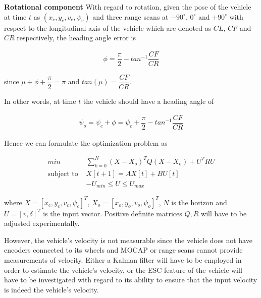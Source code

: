 \documentclass[oneside,12pt]{article}
\begin{document}
\begin{itemize}
    \begin{figure}[H]\centering
      \scalebox{1}{}
      \caption{}
      \label{}
    \end{figure}

    \textbf{Rotational component} With regard to rotation, given the pose of
    the vehicle at time $t$ as $(x_c, y_c, v_c, \psi_v)$ and three range scans
    at $-90^\circ$, $0^\circ$ and $+90^\circ$ with respect to the longitudinal
    axis of the vehicle which are denoted as $CL$, $CF$ and $CR$ respectively,
    the heading angle error is

    \begin{align}
      \phi = \dfrac{\pi}{2} - tan^{-1}\dfrac{CF}{CR}
    \end{align}

    since $\mu + \phi + \dfrac{\pi}{2} = \pi$ and $tan(\mu) = \dfrac{CF}{CR}$.

    In other words, at time $t$ the vehicle should have a heading angle of

    \begin{align}
      \psi_o = \psi_c + \phi = \psi_c + \dfrac{\pi}{2} - tan^{-1}\dfrac{CF}{CR}
    \end{align}


    \begin{figure}[H]\centering
      \scalebox{1}{}
      \caption{}
      \label{}
    \end{figure}

    Hence we can formulate the optimization problem as

    \begin{align}
      min &\sum\limits_{k=0}^N (X-X_o)^T Q (X-X_o) + U^T R U \\
      \text{subject to } & X[t+1] = A X[t] + B U[t] \\
      & -U_{min} \leq U \leq U_{max}
    \end{align}

    where $X=[x_c, y_c, v_c, \psi_c]^T$, $X_o = [x_o, y_o, v_o, \psi_o]^T$,
    $N$ is the horizon and $U=[v, \delta]^T$ is the input vector.
    Positive definite matrices $Q,R$ will have to be adjusted experimentally.

    However, the vehicle's velocity is not measurable since the vehicle does not
    have encoders connected to its wheels and MOCAP or range scans cannot
    provide measurements of velocity. Either a Kalman filter will have to be
    employed in order to estimate the vehicle's velocity, or the ESC feature of
    the vehicle will have to be investigated with regard to its ability to
    ensure that the input velocity is indeed the vehicle's velocity.
\end{itemize}
\end{document}

